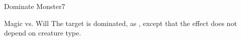 \begin{spellsection}{Dominate Monster}{7}
    \begin{spellheader}
    \end{spellheader}
    \begin{spellcontent}
        \begin{spelltargetinginfo}
        \end{spelltargetinginfo}
        \begin{spelleffects}
            \begin{spellattack}{Magic vs. Will}
                \spellsuccess The target is dominated, as , except that the effect does not depend on creature type.
            \end{spellattack}
        \end{spelleffects}
    \end{spellcontent}
    \begin{spellfooter}
        \miscastrandom
    \end{spellfooter}
\end{spellsection}

